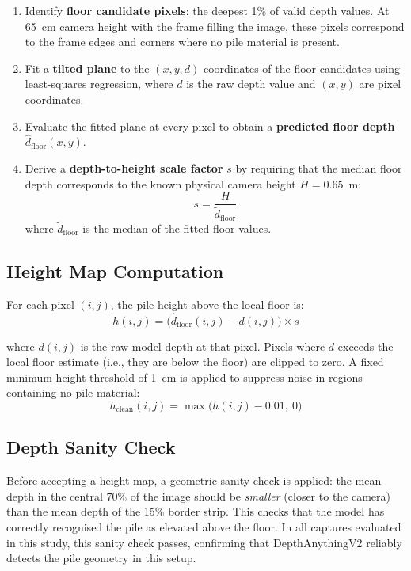 \documentclass[11pt,a4paper]{article}
\begin{document}
\begin{enumerate}
    \item Identify \textbf{floor candidate pixels}: the deepest 1\% of valid depth values.
    At 65~cm camera height with the frame filling the image, these pixels correspond to the
    frame edges and corners where no pile material is present.
    \item Fit a \textbf{tilted plane} to the $(x, y, d)$ coordinates of the floor candidates
    using least-squares regression, where $d$ is the raw depth value and $(x, y)$ are pixel
    coordinates.
    \item Evaluate the fitted plane at every pixel to obtain a \textbf{predicted floor depth}
    $\hat{d}_\text{floor}(x, y)$.
    \item Derive a \textbf{depth-to-height scale factor} $s$ by requiring that the median floor
    depth corresponds to the known physical camera height $H = 0.65$~m:
    \[
        s = \frac{H}{\tilde{d}_\text{floor}}
    \]
    where $\tilde{d}_\text{floor}$ is the median of the fitted floor values.
\end{enumerate}

\subsection{Height Map Computation}

For each pixel $(i,j)$, the pile height above the local floor is:
\[
    h(i,j) = \bigl(\hat{d}_\text{floor}(i,j) - d(i,j)\bigr) \times s
\]

where $d(i,j)$ is the raw model depth at that pixel. Pixels where $d$ exceeds the local
floor estimate (i.e., they are below the floor) are clipped to zero. A fixed minimum height
threshold of 1~cm is applied to suppress noise in regions containing no pile material:
\[
    h_\text{clean}(i,j) = \max\bigl(h(i,j) - 0.01,\ 0\bigr)
\]

\subsection{Depth Sanity Check}

Before accepting a height map, a geometric sanity check is applied: the mean depth in the
central 70\% of the image should be \textit{smaller} (closer to the camera) than the mean
depth of the 15\% border strip. This checks that the model has correctly recognised the pile
as elevated above the floor. In all captures evaluated in this study, this sanity check passes,
confirming that DepthAnythingV2 reliably detects the pile geometry in this setup.
\end{document}
